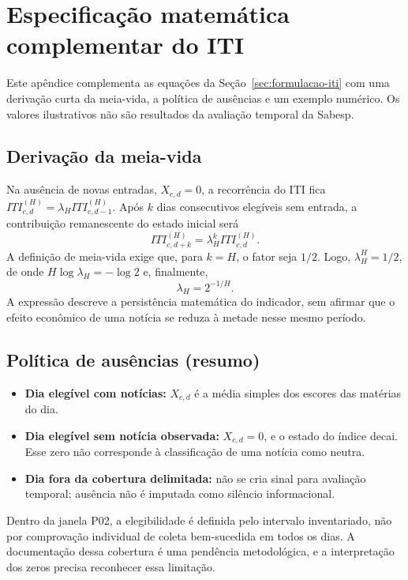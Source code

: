 \chapter{Especificação matemática complementar do ITI}
\label{ap:iti-math}

Este apêndice complementa as equações da Seção~\ref{sec:formulacao-iti} com uma derivação curta da meia-vida, a política de ausências e um exemplo numérico. Os valores ilustrativos não são resultados da avaliação temporal da Sabesp.

\section{Derivação da meia-vida}

Na ausência de novas entradas, $X_{c,d}=0$, a recorrência do ITI fica $ITI_{c,d}^{(H)}=\lambda_H ITI_{c,d-1}^{(H)}$. Após $k$ dias consecutivos elegíveis sem entrada, a contribuição remanescente do estado inicial será
\begin{equation}
    ITI_{c,d+k}^{(H)}=\lambda_H^k ITI_{c,d}^{(H)}.
\end{equation}
A definição de meia-vida exige que, para $k=H$, o fator seja $1/2$. Logo, $\lambda_H^H=1/2$, de onde $H\log\lambda_H=-\log 2$ e, finalmente,
\begin{equation}
    \lambda_H=2^{-1/H}.
\end{equation}
A expressão descreve a persistência matemática do indicador, sem afirmar que o efeito econômico de uma notícia se reduza à metade nesse mesmo período.

\section{Política de ausências (resumo)}

\begin{itemize}
    \item \textbf{Dia elegível com notícias:} $X_{c,d}$ é a média simples dos escores das matérias do dia.
    \item \textbf{Dia elegível sem notícia observada:} $X_{c,d}=0$, e o estado do índice decai. Esse zero não corresponde à classificação de uma notícia como neutra.
    \item \textbf{Dia fora da cobertura delimitada:} não se cria sinal para avaliação temporal; ausência não é imputada como silêncio informacional.
\end{itemize}

Dentro da janela P02, a elegibilidade é definida pelo intervalo inventariado, não por comprovação individual de coleta bem-sucedida em todos os dias. A documentação dessa cobertura é uma pendência metodológica, e a interpretação dos zeros precisa reconhecer essa limitação.

